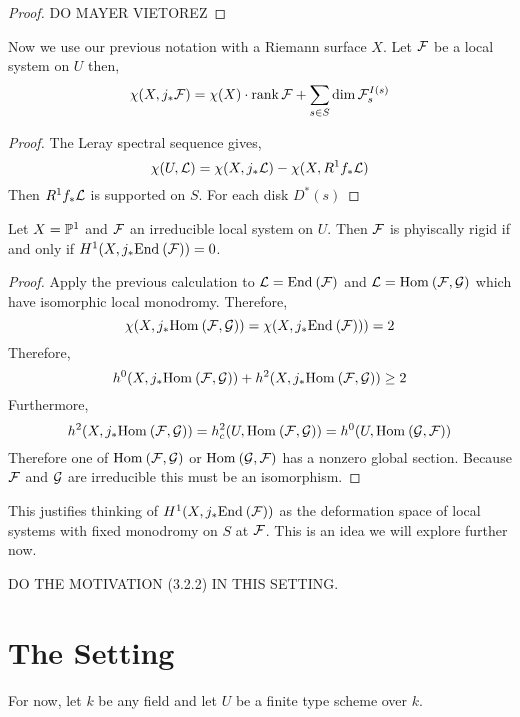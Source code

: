 \documentclass[12pt]{article}
\begin{document}
\begin{proof}
DO MAYER VIETOREZ
\end{proof}

\begin{prop}
Now we use our previous notation with a Riemann surface $X$. Let $\F$ be a local system on $U$ then,
\[ \chi(X, j_* \F) = \chi(X) \cdot \rank{\F} + \sum_{s \in S} \dim \F_s^{I(s)} \]
\end{prop}

\begin{proof}
The Leray spectral sequence gives,
\[ \chi(U, \L) = \chi(X, j_* \L) - \chi(X, R^1 f_* \L) \]
Then $R^1 f_* \L$ is supported on $S$. For each disk $D^*(s)$ 
\end{proof}

\begin{prop}
Let $X = \P^1$ and $\F$ an irreducible local system on $U$. Then $\F$ is phyiscally rigid if and only if $H^1(X, j_* \End{\F}) = 0$.
\end{prop}

\begin{proof}
Apply the previous calculation to $\L = \End{\F}$ and $\L = \Hom{}{\F}{\G}$ which have isomorphic local monodromy. Therefore,
\[ \chi(X, j_* \Hom{}{\F}{\G}) = \chi(X, j_* \End{\F})) = 2 \]
Therefore,
\[ h^0(X, j_* \Hom{}{\F}{\G}) + h^2(X, j_* \Hom{}{\F}{\G}) \ge 2 \]
Furthermore,
\[ h^2(X, j_* \Hom{}{\F}{\G}) = h^2_c(U, \Hom{}{\F}{\G}) = h^0(U, \Hom{}{\G}{\F}) \]
Therefore one of $\Hom{}{\F}{\G}$ or $\Hom{}{\G}{\F}$ has a nonzero global section. Because $\F$ and $\G$ are irreducible this must be an isomorphism. 
\end{proof}

\begin{rmk}
This justifies thinking of $H^1(X, j_* \End{\F})$ as the deformation space of local systems with fixed monodromy on $S$ at $\F$. This is an idea we will explore further now. 
\end{rmk}

DO THE MOTIVATION (3.2.2) IN THIS SETTING.

\section{The \etale Setting}

\newcommand{\Loc}{\mathrm{Loc}}
\newcommand{\Qbar}{\overline{\Q}}

\begin{rmk}
For now, let $k$ be any field and let $U$ be a finite type scheme over $k$.
\end{rmk}
\end{document}
